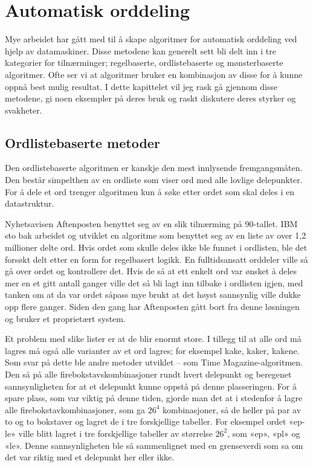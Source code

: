 \chapter{Automatisk orddeling}
\label{sec:automatisk-orddeling}

Mye arbeidet har gått med til å skape algoritmer for automatisk orddeling ved hjelp av datamaskiner. Disse metodene kan generelt sett bli delt inn i tre kategorier for tilnærminger; regelbaserte, ordlistebaserte og mønsterbaserte algoritmer. Ofte ser vi at algoritmer bruker en kombinasjon av disse for å kunne oppnå best mulig resultat. I dette kapittelet vil jeg rask gå gjennom disse metodene, gi noen eksempler på deres bruk og raskt diskutere deres styrker og svakheter.

\section{Ordlistebaserte metoder}

Den ordlistebaserte algoritmen er kanskje den mest innlysende fremgangsmåten. Den består simpelthen av en ordliste som viser ord med alle lovlige delepunkter. For å dele et ord trenger algoritmen kun å søke etter ordet som skal deles i en datastruktur. 

Nyhetsavisen Aftenposten benyttet seg av en slik tilnærming på 90-tallet. IBM sto bak arbeidet og utviklet en algoritme som benyttet seg av en liste av over 1,2 millioner delte ord. Hvis ordet som skulle deles ikke ble funnet i ordlisten, ble det forsøkt delt etter en form for regelbasert logikk. En fulltidsansatt orddeler ville så gå over ordet og kontrollere det. Hvis de så at ett enkelt ord var ønsket å deles mer en et gitt antall ganger ville det så bli lagt inn tilbake i ordlisten igjen, med tanken om at da var ordet såpass mye brukt at det høyst sannsynlig ville dukke opp flere ganger. Siden den gang har Aftenposten gått bort fra denne løsningen og bruker et proprietært system. \cite{thoresen1993virtuelle,eng-aftenposten}

Et problem med slike lister er at de blir enormt store. I tillegg til at alle ord må lagres må også alle varianter av et ord lagres; for eksempel kake, kaker, kakene. Som svar på dette ble andre metoder utviklet -- som Time Magazine-algoritmen. Den så på alle firebokstavskombinasjoner rundt hvert delepunkt og beregenet sannsynligheten for at et delepunkt kunne oppstå på denne plasseringen. For å spare plass, som var viktig på denne tiden, gjorde man det at i stedenfor å lagre alle firebokstavkombinasjoner, som ga $26^4$ kombinasjoner, så de heller på par av to og to bokstaver og lagret de i tre forskjellige tabeller. For eksempel ordet «ep-le» ville blitt lagret i tre forskjellige tabeller av størrelse $26^2$, som «ep», «pl» og «le». Denne sannsynligheten ble så sammenlignet med en grenseverdi som sa om det var riktig med et delepunkt her eller ikke. 

